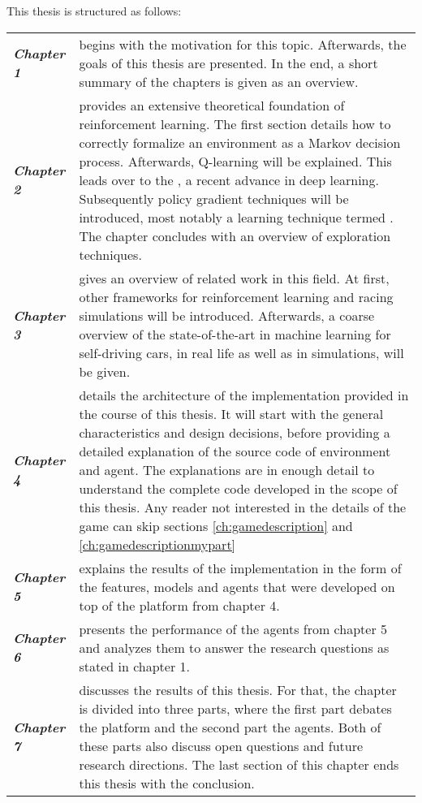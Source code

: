 This thesis is structured as follows:


\renewcommand{\arraystretch}{1.3}
\begin{flushleft}
\begin{tabular}{>{\em}p{2.1cm} p{\textwidth-3.1cm}} 
	\textbf{Chapter 1} & begins with the motivation for this topic. Afterwards, the goals of this thesis are presented. In the end, a short summary of the chapters is given as an overview.\\
	\textbf{Chapter 2} & provides an extensive theoretical foundation of reinforcement learning. The first section details how to correctly formalize an environment as a Markov decision process. Afterwards, Q-learning will be explained. This leads over to the \keyword{Deep Q Network}, a recent advance in deep learning. Subsequently policy gradient techniques will be introduced, most notably a learning technique termed \keyword{Deep DPG}. The chapter concludes with an overview of exploration techniques.\\
	\textbf{Chapter 3} & gives an overview of related work in this field. At first, other frameworks for reinforcement learning and racing simulations will be introduced. Afterwards, a coarse overview of the state-of-the-art in machine learning for self-driving cars, in real life as well as in simulations, will be given.\\
	\textbf{Chapter 4} & details the architecture of the implementation provided in the course of this thesis. It will start with the general characteristics and design decisions, before providing a detailed explanation of the source code of environment and agent. The explanations are in enough detail to understand the complete code developed in the scope of this thesis. Any reader not interested in the details of the game can skip sections \ref{ch:gamedescription} and \ref{ch:gamedescriptionmypart}\\
	\textbf{Chapter 5} & explains the results of the implementation in the form of the features, models and agents that were developed on top of the platform from chapter 4.\\
	\textbf{Chapter 6} & presents the performance of the agents from chapter 5 and analyzes them to answer the research questions as stated in chapter 1.\\
	\textbf{Chapter 7} & discusses the results of this thesis. For that, the chapter is divided into three parts, where the first part debates the platform and the second part the agents. Both of these parts also discuss open questions and future research directions. The last section of this chapter ends this thesis with the conclusion.\\
\end{tabular}
\end{flushleft}